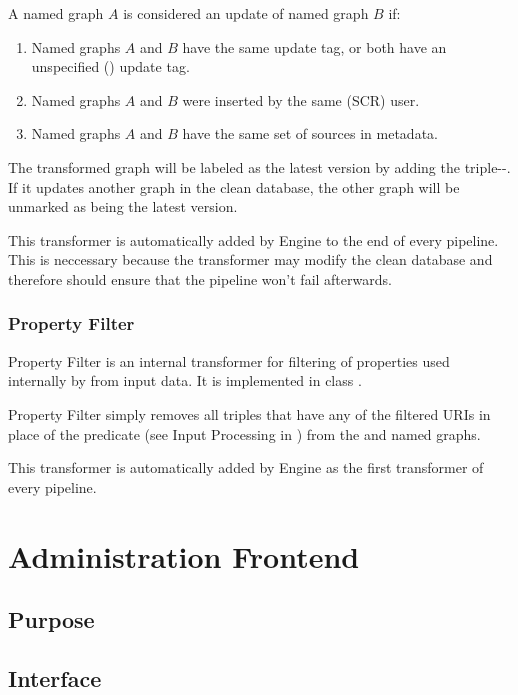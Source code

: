 A named graph $A$ is considered an update of named graph $B$ if:
\begin{enumerate}
		\item Named graphs $A$ and $B$ have the same update tag, or both have an unspecified () update tag.
	  \item Named graphs $A$ and $B$ were inserted by the same (SCR) user.
	  \item Named graphs $A$ and $B$ have the same set of sources in metadata.
\end{enumerate}

The transformed graph will be labeled as the latest version by adding  the triple\linebreak {}--. If it updates another graph in the clean database, the other graph will be unmarked as being the latest version.

This transformer is automatically added by Engine to the end of every pipeline. This is neccessary because the transformer may modify the clean database and therefore should ensure that the pipeline won't fail afterwards.

\subsection{Property Filter}
Property Filter is an internal transformer for filtering of properties used internally by \odcs from input data. It is implemented in class .

Property Filter simply removes all triples that have any of the filtered URIs in place of the predicate (see Input Processing in ) from the  and  named graphs.

This transformer is automatically added by Engine as the first transformer of every pipeline.

\chapter{Administration Frontend}
\section{Purpose}
\section{Interface}

